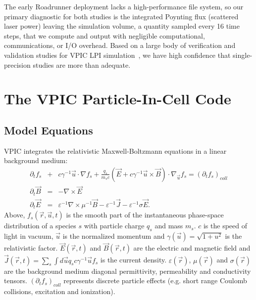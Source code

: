 \documentclass[10pt]{article}
\newcommand{\eps}{\varepsilon}
\newcommand{\vecr}{\vec{r}}
\newcommand{\vecu}{\vec{u}}
\newcommand{\vecJ}{\vec{J}}
\newcommand{\vecE}{\vec{E}}
\newcommand{\vecB}{\vec{B}}
\newcommand{\PDeriv}[2]{\partial_{#2}#1}
\newcommand{\DotP}[2]{#1 \cdot #2}
\newcommand{\CrossP}[2]{#1 \times #2}
\newcommand{\Grad}[1]{\nabla #1}
\newcommand{\Curl}[1]{\nabla \times #1}
\newcommand{\Gradu}[1]{\nabla_{\vecu} #1}
\begin{document}
The early Roadrunner deployment lacks a high-performance file system,
so our primary diagnostic for both studies is the integrated Poynting
flux (scattered laser power) leaving the simulation volume, a quantity
sampled every 16 time steps, that we compute and output with
negligible computational, communications, or I/O overhead.  Based on a
large body of verification and validation studies for VPIC LPI
simulation~\cite{}, we have high confidence that single-precision
studies are more than adequate.


\section{The VPIC Particle-In-Cell Code}

\subsection{Model Equations}

VPIC integrates the relativistic Maxwell-Boltzmann equations in a
linear background medium:
\begin{eqnarray}
\PDeriv{f_s}{t} &+& 
\DotP{c\gamma^{-1}\vecu}{\Grad{f_s}} +
\DotP{\frac{q_s}{m_s c}\left(\vecE+\CrossP{c\gamma^{-1}\vecu}{\vecB}\right)}
{\Gradu{f_s}} = \left(\PDeriv{f_s}{t}\right)_{coll} \label{eq:Boltzmann}\\
\PDeriv{\vecB}{t} &=& -\Curl{\vecE} \label{eq:Faraday}\\
\PDeriv{\vecE}{t} &=&
\eps^{-1}\Curl{\mu^{-1}\vecB} - \eps^{-1}\vecJ - \eps^{-1}\sigma\vecE
\label{eq:Ampere}
.
\end{eqnarray}
Above, $f_s\left(\vecr,\vecu,t\right)$ is the smooth part of the
instantaneous phase-space distribution of a species $s$ with particle
charge $q_s$ and mass $m_s$.  $c$ is the speed of light in vacuum,
$\vecu$ is the normalized momentum and $\gamma\left(\vecu\right) =
\sqrt{1 + u^2}$ is the relativistic factor.
$\vecE\left(\vecr,t\right)$ and $\vecB\left(\vecr,t\right)$ are the
electric and magnetic field and $\vecJ\left(\vecr,t\right) =
\sum_s \int d\vecu q_s c\gamma^{-1}\vecu f_s$ is the current
density.  $\eps\left(\vecr\right)$, $\mu\left(\vecr\right)$ and
$\sigma\left(\vecr\right)$ are the background medium diagonal
permittivity, permeability and conductivity tensors.
$\left(\PDeriv{f_s}{t}\right)_{coll}$ represents discrete
particle effects (e.g. short range Coulomb collisions, excitation and
ionization).
\end{document}
